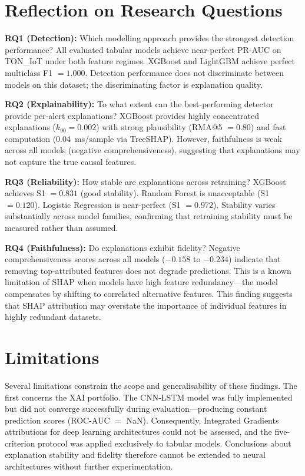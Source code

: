 \documentclass[12pt,a4paper]{report}
\begin{document}
\section{Reflection on Research Questions}
\label{sec:rq-reflection}

\textbf{RQ1 (Detection):} Which modelling approach provides the strongest detection performance? All evaluated tabular models achieve near-perfect PR-AUC on TON\_IoT under both feature regimes. XGBoost and LightGBM achieve perfect multiclass F1 $= 1.000$. Detection performance does not discriminate between models on this dataset; the discriminating factor is explanation quality.

\textbf{RQ2 (Explainability):} To what extent can the best-performing detector provide per-alert explanations? XGBoost provides highly concentrated explanations ($k_{90} = 0.002$) with strong plausibility (RMA@5 $= 0.80$) and fast computation (0.04~ms/sample via TreeSHAP). However, faithfulness is weak across all models (negative comprehensiveness), suggesting that explanations may not capture the true causal features.

\textbf{RQ3 (Reliability):} How stable are explanations across retraining? XGBoost achieves S1 $= 0.831$ (good stability). Random Forest is unacceptable (S1 $= 0.120$). Logistic Regression is near-perfect (S1 $= 0.972$). Stability varies substantially across model families, confirming that retraining stability must be measured rather than assumed.

\textbf{RQ4 (Faithfulness):} Do explanations exhibit fidelity? Negative comprehensiveness scores across all models ($-0.158$ to $-0.234$) indicate that removing top-attributed features does not degrade predictions. This is a known limitation of SHAP when models have high feature redundancy---the model compensates by shifting to correlated alternative features. This finding suggests that SHAP attribution may overstate the importance of individual features in highly redundant datasets.

\section{Limitations}
\label{sec:limitations}

Several limitations constrain the scope and generalisability of these findings. The first concerns the XAI portfolio. The CNN-LSTM model was fully implemented but did not converge successfully during evaluation---producing constant prediction scores (ROC-AUC $=$ NaN). Consequently, Integrated Gradients attributions for deep learning architectures could not be assessed, and the five-criterion protocol was applied exclusively to tabular models. Conclusions about explanation stability and fidelity therefore cannot be extended to neural architectures without further experimentation.
\end{document}
